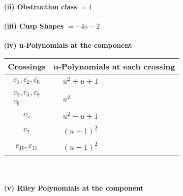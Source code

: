 \documentclass[1p]{elsarticle_modified}
\theoremstyle{definition}
\begin{document}
\flushleft \textbf{(ii) Obstruction class $= 1$}\\~\\
\flushleft \textbf{(iii) Cusp Shapes $= -4 a-2$}\\~\\
\newpage\renewcommand{\arraystretch}{1}
\flushleft \textbf{(iv) u-Polynomials at the component}\newline \\
\begin{tabular}{m{50pt}|m{274pt}}
Crossings & \hspace{64pt}u-Polynomials at each crossing \\
\hline $$\begin{aligned}c_{1},c_{2},c_{6}\end{aligned}$$&$\begin{aligned}
&u^2+u+1
\end{aligned}$\\
\hline $$\begin{aligned}c_{3},c_{4},c_{8}\\c_{9}\end{aligned}$$&$\begin{aligned}
&u^2
\end{aligned}$\\
\hline $$\begin{aligned}c_{5}\end{aligned}$$&$\begin{aligned}
&u^2- u+1
\end{aligned}$\\
\hline $$\begin{aligned}c_{7}\end{aligned}$$&$\begin{aligned}
&(u-1)^2
\end{aligned}$\\
\hline $$\begin{aligned}c_{10},c_{11}\end{aligned}$$&$\begin{aligned}
&(u+1)^2
\end{aligned}$\\
\hline
\end{tabular}\\~\\
\newpage\renewcommand{\arraystretch}{1}
\flushleft \textbf{(v) Riley Polynomials at the component}\newline \\
\end{document}
